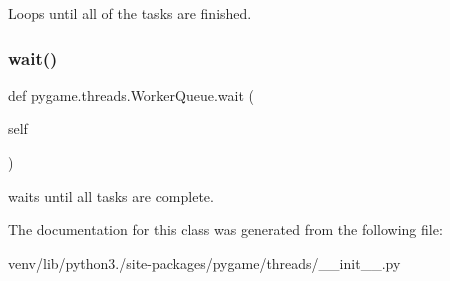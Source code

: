 \begin{DoxyVerb}Loops until all of the tasks are finished.
\end{DoxyVerb}
 \mbox{\label{classpygame_1_1threads_1_1_worker_queue_a71960e68ef9c1f2b1499ab4f1b566da1}} 
\subsubsection{\texorpdfstring{wait()}{wait()}}
{\footnotesize\ttfamily def pygame.\+threads.\+Worker\+Queue.\+wait (\begin{DoxyParamCaption}\item[{}]{self }\end{DoxyParamCaption})}

\begin{DoxyVerb}waits until all tasks are complete.
\end{DoxyVerb}
 

The documentation for this class was generated from the following file\+:\begin{DoxyCompactItemize}
\item 
venv/lib/python3./site-\/packages/pygame/threads/\+\_\+\+\_\+init\+\_\+\+\_\+.\+py\end{DoxyCompactItemize}
